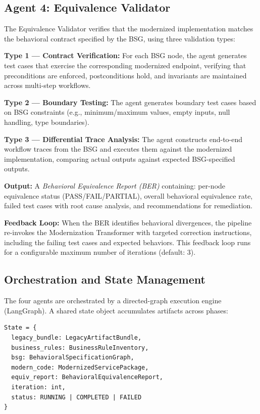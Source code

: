 \documentclass[conference]{IEEEtran}
\begin{document}
\subsection{Agent 4: Equivalence Validator}

The Equivalence Validator verifies that the modernized implementation matches the behavioral contract specified by the BSG, using three validation types:

\textbf{Type 1 --- Contract Verification:} For each BSG node, the agent generates test cases that exercise the corresponding modernized endpoint, verifying that preconditions are enforced, postconditions hold, and invariants are maintained across multi-step workflows.

\textbf{Type 2 --- Boundary Testing:} The agent generates boundary test cases based on BSG constraints (e.g., minimum/maximum values, empty inputs, null handling, type boundaries).

\textbf{Type 3 --- Differential Trace Analysis:} The agent constructs end-to-end workflow traces from the BSG and executes them against the modernized implementation, comparing actual outputs against expected BSG-specified outputs.

\textbf{Output:} A \textit{Behavioral Equivalence Report (BER)} containing: per-node equivalence status (PASS/FAIL/PARTIAL), overall behavioral equivalence rate, failed test cases with root cause analysis, and recommendations for remediation.

\textbf{Feedback Loop:} When the BER identifies behavioral divergences, the pipeline re-invokes the Modernization Transformer with targeted correction instructions, including the failing test cases and expected behaviors. This feedback loop runs for a configurable maximum number of iterations (default: 3).

\subsection{Orchestration and State Management}

The four agents are orchestrated by a directed-graph execution engine (LangGraph). A shared state object accumulates artifacts across phases:

\begin{lstlisting}[caption={Pipeline State Object}]
State = {
  legacy_bundle: LegacyArtifactBundle,
  business_rules: BusinessRuleInventory,
  bsg: BehavioralSpecificationGraph,
  modern_code: ModernizedServicePackage,
  equiv_report: BehavioralEquivalenceReport,
  iteration: int,
  status: RUNNING | COMPLETED | FAILED
}
\end{lstlisting}
\end{document}
